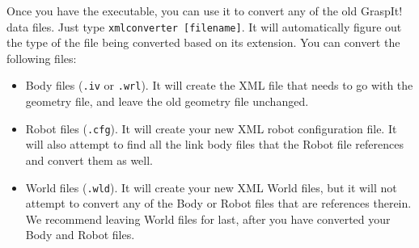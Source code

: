 Once you have the executable, you can use it to convert any of the old
GraspIt! data files. Just type \texttt{xmlconverter [filename]}. It
will automatically figure out the type of the file being converted
based on its extension. You can convert the following files:
\begin{itemize}
\item Body files (\texttt{.iv} or \texttt{.wrl}). It will create the
  XML file that needs to go with the geometry file, and leave the old
  geometry file unchanged.
\item Robot files (\texttt{.cfg}). It will create your new XML robot
  configuration file. It will also attempt to find all the link body
  files that the Robot file references and convert them as well.
\item World files (\texttt{.wld}). It will create your new XML World
  files, but it will not attempt to convert any of the Body or Robot
  files that are references therein. We recommend leaving World files
  for last, after you have converted your Body and Robot files.
\end{itemize}
